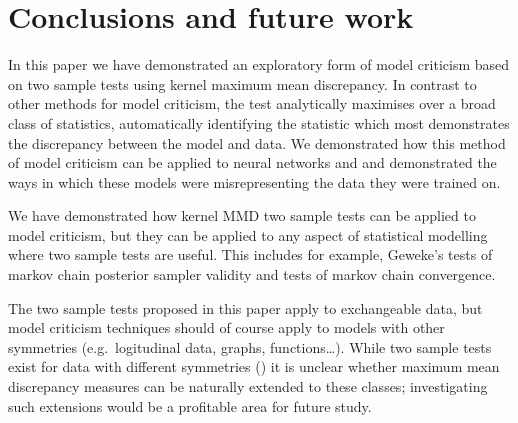 \documentclass{article} %
\def\eg{e.g.\ }
\begin{document}
\section{Conclusions and future work}

In this paper we have demonstrated an exploratory form of model criticism based on two sample tests using kernel maximum mean discrepancy.
In contrast to other methods for model criticism, the test analytically maximises over a broad class of statistics, automatically identifying the statistic which most demonstrates the discrepancy between the model and data.
We demonstrated how this method of model criticism can be applied to neural networks and  and demonstrated the ways in which these models were misrepresenting the data they were trained on.

We have demonstrated how kernel MMD two sample tests can be applied to model criticism, but they can be applied to any aspect of statistical modelling where two sample tests are useful.
This includes for example, Geweke's tests of markov chain posterior sampler validity \citep{Geweke2004-yx} and tests of markov chain convergence.

The two sample tests proposed in this paper apply to exchangeable data, but model criticism techniques should of course apply to models with other symmetries (\eg logitudinal data, graphs, functions\ldots).
While two sample tests exist for data with different symmetries () it is unclear whether maximum mean discrepancy measures can be naturally extended to these classes; investigating such extensions would be a profitable area for future study.


\newpage



\end{document}
